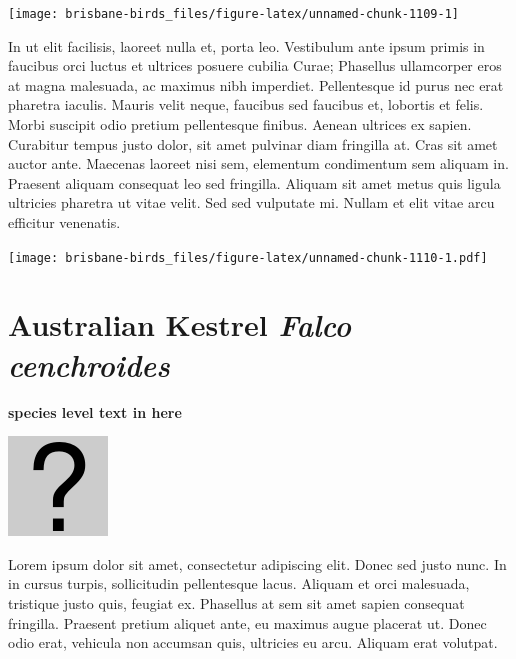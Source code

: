 \documentclass[]{book}
\let\origfigure\figure
\let\endorigfigure\endfigure
\renewenvironment{figure}[1][2] {
  \expandafter\origfigure\expandafter[H]
} {
  \endorigfigure
}
\begin{document}
\begin{figure}
\texttt{[image: brisbane-birds\_files/figure-latex/unnamed-chunk-1109-1]} \caption{insert figure caption}\label{fig:unnamed-chunk-1109}
\end{figure}

In ut elit facilisis, laoreet nulla et, porta leo. Vestibulum ante ipsum
primis in faucibus orci luctus et ultrices posuere cubilia Curae;
Phasellus ullamcorper eros at magna malesuada, ac maximus nibh
imperdiet. Pellentesque id purus nec erat pharetra iaculis. Mauris velit
neque, faucibus sed faucibus et, lobortis et felis. Morbi suscipit odio
pretium pellentesque finibus. Aenean ultrices ex sapien. Curabitur
tempus justo dolor, sit amet pulvinar diam fringilla at. Cras sit amet
auctor ante. Maecenas laoreet nisi sem, elementum condimentum sem
aliquam in. Praesent aliquam consequat leo sed fringilla. Aliquam sit
amet metus quis ligula ultricies pharetra ut vitae velit. Sed sed
vulputate mi. Nullam et elit vitae arcu efficitur venenatis.

\begin{figure}
\centering
\texttt{[image: brisbane-birds\_files/figure-latex/unnamed-chunk-1110-1.pdf]}
\caption{\label{fig:unnamed-chunk-1110}insert figure caption}
\end{figure}

\section{\texorpdfstring{Australian Kestrel \emph{Falco
cenchroides}}{Australian Kestrel Falco cenchroides}}\label{australian-kestrel-falco-cenchroides}

\textbf{species level text in here}

\begin{figure}
\centering
\includegraphics{assets/missing.png}
\caption{No image for species}
\end{figure}

Lorem ipsum dolor sit amet, consectetur adipiscing elit. Donec sed justo
nunc. In in cursus turpis, sollicitudin pellentesque lacus. Aliquam et
orci malesuada, tristique justo quis, feugiat ex. Phasellus at sem sit
amet sapien consequat fringilla. Praesent pretium aliquet ante, eu
maximus augue placerat ut. Donec odio erat, vehicula non accumsan quis,
ultricies eu arcu. Aliquam erat volutpat.
\end{document}
